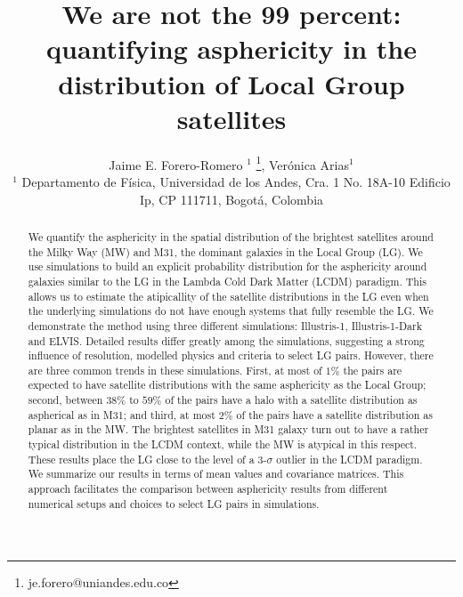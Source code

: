 \documentclass[a4paper,fleqn,usenatbib]{mnras}
\begin{document}
\title[LG satellites distribution asphericity]{We are not the 99 percent: quantifying
  asphericity in the distribution of Local Group satellites}
\author[J.E. Forero-Romero \& V. Arias]
{Jaime E. Forero-Romero $^{1}$ \thanks{je.forero@uniandes.edu.co},
Ver\'onica Arias$^1$\\
$^1$ Departamento de F\'isica, Universidad de los Andes, Cra. 1
  No. 18A-10 Edificio Ip, CP 111711, Bogot\'a, Colombia \\
}

\maketitle

\begin{abstract}
We quantify the asphericity in the spatial distribution of the
brightest satellites around the Milky Way (MW) and M31, the dominant
galaxies in the Local Group (LG).
We use simulations to build an explicit probability distribution for the
asphericity around galaxies similar to the LG in the Lambda Cold Dark
Matter (LCDM) paradigm.
This allows us to estimate the atipicallity
of the satellite distributions in the LG even when the underlying
simulations do not have enough systems that fully resemble the LG.
We demonstrate the method using three different simulations:
Illustris-1,  Illustris-1-Dark and ELVIS. 
Detailed results differ greatly among the simulations, suggesting a
strong influence of resolution, modelled physics and criteria to select
LG pairs.
However, there are three common trends in these simulations. First, at most of
$1\%$ the pairs are expected to have satellite distributions with the
same asphericity as the Local Group; second, between
$38\%$ to $59\%$ of the pairs have a halo with a satellite
distribution as aspherical as in M31; and third, at most $2\%$ of the
pairs have a satellite distribution as planar as in the MW. 
The brightest satellites in M31 galaxy turn out to have a rather typical distribution 
in the LCDM context, while the MW is atypical in this respect. 
These results place the LG close to the level of a 3-$\sigma$ outlier
in the LCDM paradigm.
We summarize our results in terms of mean values and covariance
matrices. 
This approach facilitates the comparison between asphericity results
from different numerical setups and choices to select LG pairs in
simulations.  
\end{abstract}
\end{document}
